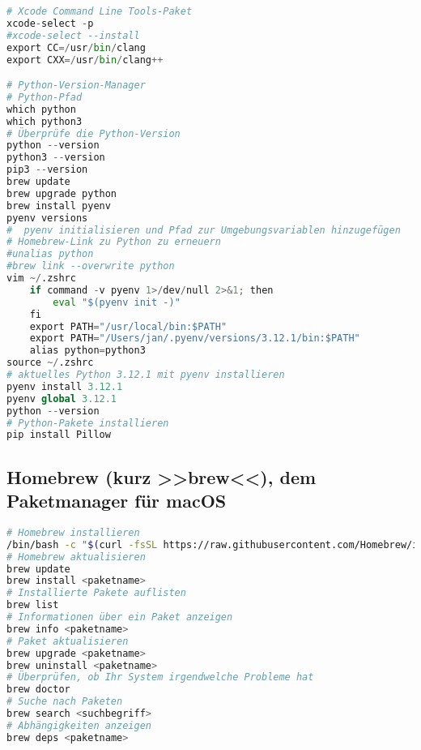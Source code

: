 \documentclass{vorlage-design-main}
\begin{document}
\begin{lstlisting}[language=Python]
# Xcode Command Line Tools-Paket
xcode-select -p
#xcode-select --install
export CC=/usr/bin/clang
export CXX=/usr/bin/clang++

# Python-Version-Manager
# Python-Pfad
which python
which python3
# Überprüfe die Python-Version
python --version
python3 --version
pip3 --version
brew update
brew upgrade python
brew install pyenv
pyenv versions
#  pyenv initialisieren und Pfad zur Umgebungsvariablen hinzugefügen
# Homebrew-Link zu Python zu erneuern
#unalias python
#brew link --overwrite python
vim ~/.zshrc
    if command -v pyenv 1>/dev/null 2>&1; then
        eval "$(pyenv init -)"
    fi
    export PATH="/usr/local/bin:$PATH"
    export PATH="/Users/jan/.pyenv/versions/3.12.1/bin:$PATH"
    alias python=python3
source ~/.zshrc
# aktuelles Python 3.12.1 mit pyenv installieren
pyenv install 3.12.1
pyenv global 3.12.1
python --version
# Python-Pakete installieren
pip install Pillow
\end{lstlisting}

\hypertarget{homebrew-kurz-brew-dem-paketmanager-fuxfcr-macos}{%
\subsection{Homebrew (kurz >>brew<<), dem Paketmanager für
macOS}\label{homebrew-kurz-brew-dem-paketmanager-fuer-macos}}

\begin{lstlisting}[language=bash]
# Homebrew installieren
/bin/bash -c "$(curl -fsSL https://raw.githubusercontent.com/Homebrew/install/HEAD/install.sh)"
# Homebrew aktualisieren
brew update
brew install <paketname>
# Installierte Pakete auflisten
brew list
# Informationen über ein Paket anzeigen
brew info <paketname>
# Paket aktualisieren
brew upgrade <paketname>
brew uninstall <paketname>
# Überprüfen, ob Ihr System irgendwelche Probleme hat
brew doctor
# Suche nach Paketen
brew search <suchbegriff>
# Abhängigkeiten anzeigen
brew deps <paketname>
\end{lstlisting}


\clearpage
\printbibliography
\end{document}
